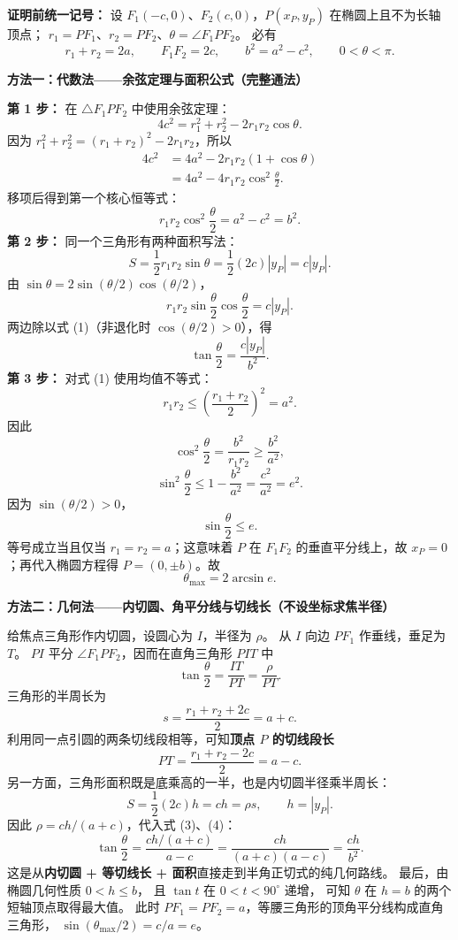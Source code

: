 \begin{proofbox}
\textbf{证明前统一记号：}
设 $F_1(-c,0)$、$F_2(c,0)$，$P(x_P,y_P)$ 在椭圆上且不为长轴顶点；
$r_1=PF_1$、$r_2=PF_2$、$\theta=\angle F_1PF_2$。
必有
\[
r_1+r_2=2a,\qquad F_1F_2=2c,\qquad
b^2=a^2-c^2,\qquad 0<\theta<\pi.
\]

\textbf{方法一：代数法——余弦定理与面积公式（完整通法）}

\textbf{第 1 步：} 在 $\triangle F_1PF_2$ 中使用余弦定理：
\[
4c^2=r_1^2+r_2^2-2r_1r_2\cos\theta.
\]
因为 $r_1^2+r_2^2=(r_1+r_2)^2-2r_1r_2$，所以
\[
\begin{aligned}
4c^2
 &=4a^2-2r_1r_2(1+\cos\theta)\\
 &=4a^2-4r_1r_2\cos^2\frac\theta2.
\end{aligned}
\]
移项后得到第一个核心恒等式：
\[
\boxed{r_1r_2\cos^2\frac\theta2=a^2-c^2=b^2}.\tag{1}
\]
\textbf{第 2 步：} 同一个三角形有两种面积写法：
\[
S=\frac12r_1r_2\sin\theta
 =\frac12(2c)|y_P|=c|y_P|.
\]
由 $\sin\theta=2\sin(\theta/2)\cos(\theta/2)$，
\[
r_1r_2\sin\frac\theta2\cos\frac\theta2=c|y_P|.
\]
两边除以式 (1)（非退化时 $\cos(\theta/2)>0$），得
\[
\boxed{\tan\frac\theta2=\frac{c|y_P|}{b^2}}.\tag{2}
\]
\textbf{第 3 步：} 对式 (1) 使用均值不等式：
\[
r_1r_2\le\left(\frac{r_1+r_2}{2}\right)^2=a^2.
\]
因此
\[
\cos^2\frac\theta2=\frac{b^2}{r_1r_2}\ge\frac{b^2}{a^2},
\]
\[
\sin^2\frac\theta2\le1-\frac{b^2}{a^2}
=\frac{c^2}{a^2}=e^2.
\]
因为 $\sin(\theta/2)>0$，
\[
\boxed{\sin\frac\theta2\le e}.
\]
等号成立当且仅当 $r_1=r_2=a$；这意味着 $P$ 在
$F_1F_2$ 的垂直平分线上，故 $x_P=0$；再代入椭圆方程得
$P=(0,\pm b)$。故
\[
\boxed{\theta_{\max}=2\arcsin e}.
\]

\textbf{方法二：几何法——内切圆、角平分线与切线长（不设坐标求焦半径）}

给焦点三角形作内切圆，设圆心为 $I$，半径为 $\rho$。
从 $I$ 向边 $PF_1$ 作垂线，垂足为 $T$。
$PI$ 平分 $\angle F_1PF_2$，因而在直角三角形 $PIT$ 中
\[
\tan\frac\theta2=\frac{IT}{PT}=\frac\rho{PT}.\tag{3}
\]
三角形的半周长为
\[
s=\frac{r_1+r_2+2c}{2}=a+c.
\]
利用同一点引圆的两条切线段相等，可知\textbf{顶点 $P$ 的切线段长}
\[
PT=\frac{r_1+r_2-2c}{2}=a-c.\tag{4}
\]
另一方面，三角形面积既是底乘高的一半，也是内切圆半径乘半周长：
\[
S=\frac12(2c)h=ch=\rho s,\qquad h=|y_P|.
\]
因此 $\rho=ch/(a+c)$，代入式 (3)、(4)：
\[
\tan\frac\theta2
=\frac{ch/(a+c)}{a-c}
=\frac{ch}{(a+c)(a-c)}
=\boxed{\frac{ch}{b^2}}.
\]
这是从\textbf{内切圆 + 等切线长 + 面积}直接走到半角正切式的纯几何路线。
最后，由椭圆几何性质 $0<h\le b$，
且 $\tan t$ 在 $0<t<90^\circ$ 递增，
可知 $\theta$ 在 $h=b$ 的两个短轴顶点取得最大值。
此时 $PF_1=PF_2=a$，等腰三角形的顶角平分线构成直角三角形，
$\sin(\theta_{\max}/2)=c/a=e$。


\end{proofbox}
